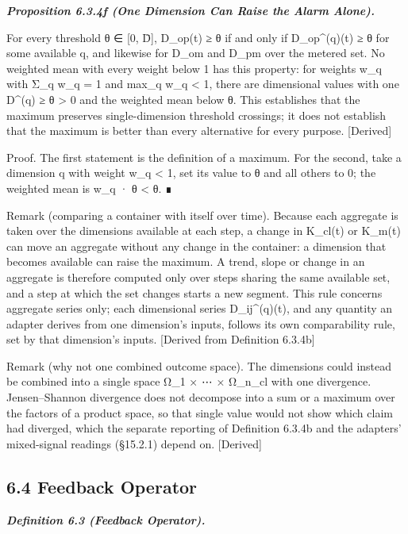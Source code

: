 \documentclass[
]{article}
\begin{document}
\emph{\textbf{Proposition 6.3.4f (One Dimension Can Raise the Alarm
Alone).}}

For every threshold θ ∈ {[}0, D̄{]}, D\_op(t) ≥ θ if and only if
D\_op\^{}(q)(t) ≥ θ for some available q, and likewise for D\_om and
D\_pm over the metered set. No weighted mean with every weight below 1
has this property: for weights w\_q with Σ\_q w\_q = 1 and max\_q w\_q
\textless{} 1, there are dimensional values with one D\^{}(q) ≥ θ
\textgreater{} 0 and the weighted mean below θ. This establishes that
the maximum preserves single-dimension threshold crossings; it does not
establish that the maximum is better than every alternative for every
purpose. {[}Derived{]}

Proof. The first statement is the definition of a maximum. For the
second, take a dimension q with weight w\_q \textless{} 1, set its value
to θ and all others to 0; the weighted mean is w\_q · θ \textless{} θ. ∎

Remark (comparing a container with itself over time). Because each
aggregate is taken over the dimensions available at each step, a change
in K\_cl(t) or K\_m(t) can move an aggregate without any change in the
container: a dimension that becomes available can raise the maximum. A
trend, slope or change in an aggregate is therefore computed only over
steps sharing the same available set, and a step at which the set
changes starts a new segment. This rule concerns aggregate series only;
each dimensional series D\_ij\^{}(q)(t), and any quantity an adapter
derives from one dimension's inputs, follows its own comparability rule,
set by that dimension's inputs. {[}Derived from Definition 6.3.4b{]}

Remark (why not one combined outcome space). The dimensions could
instead be combined into a single space Ω\_1 × ⋯ × Ω\_n\_cl with one
divergence. Jensen--Shannon divergence does not decompose into a sum or
a maximum over the factors of a product space, so that single value
would not show which claim had diverged, which the separate reporting of
Definition 6.3.4b and the adapters' mixed-signal readings (§15.2.1)
depend on. {[}Derived{]}

\hypertarget{feedback-operator}{%
\subsection{6.4 Feedback Operator}\label{feedback-operator}}

\emph{\textbf{Definition 6.3 (Feedback Operator).}}
\end{document}
